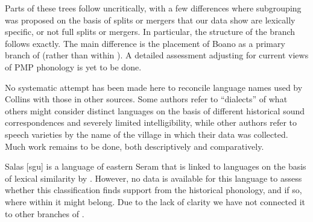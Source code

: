 {}
Parts of these trees follow \citet{Collins1983} uncritically,
with a few differences where subgrouping was proposed on the
basis of splits or mergers that our data show are lexically specific,
or not full splits or mergers.
In particular, the structure of the 
branch follows \citet{Collins1983} exactly.
The main difference is the placement of Boano as a primary branch
of  (rather than within ).
A detailed assessment adjusting for current views of PMP phonology
is yet to be done.

No systematic attempt has been made here to reconcile language
names used by Collins with those in other sources.
Some authors refer to “dialects” of what others might consider
distinct languages on the basis of different historical sound
correspondences and severely limited intelligibility,
while other authors refer to speech varieties by the name of
the village in which their data was collected.
Much work remains to be done,
both descriptively and comparatively.

Salas [sgu] is a language of eastern Seram that is linked to
 languages on the basis of lexical similarity by \citet{LoskiLoski1989}.
However, no data is available for this language to assess whether
this classification finds support from the historical phonology,
and if so, where within  it might belong.
Due to the lack of clarity we have not connected it to other branches of .
\mbox{}\\


